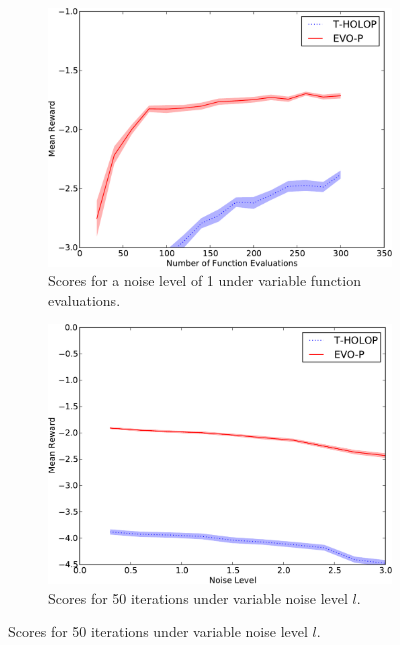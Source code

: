 \documentclass[conference]{IEEEtran}
\begin{document}
        \begin{figure}[ht]

        \begin{subfigure}[b]{0.32\textwidth}
                \centering
                \includegraphics[width=1.0\textwidth]{graphics/online-DI-crop.pdf}
                \caption{Scores for a noise level of 1 under variable function evaluations.}
                \label{fig:DI}
        \end{subfigure}   \begin{subfigure}[b]{0.32\textwidth}
                \centering
                \includegraphics[width=1.0\textwidth]{graphics/online-noise-DI_50-crop.pdf}
                  \caption{Scores for 50 iterations under variable noise level $l$. }

\end{subfigure}
\end{figure}
\end{document}
